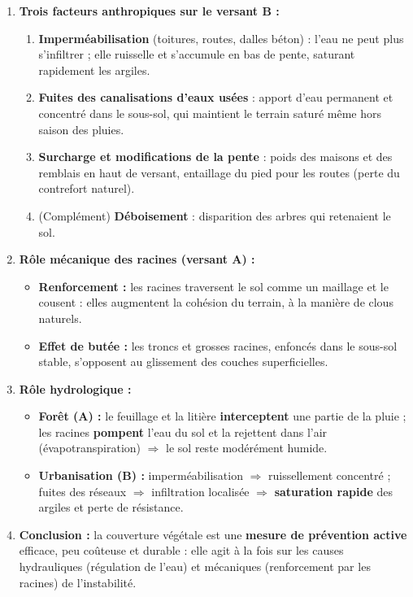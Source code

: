 \documentclass[11pt]{article}
\begin{document}
\begin{corrige}
\tcblower
\begin{enumerate}
\item \textbf{Trois facteurs anthropiques sur le versant B :}
      \begin{enumerate}
      \item \textbf{Imperméabilisation} (toitures, routes, dalles béton) : l'eau ne peut plus s'infiltrer ; elle ruisselle et s'accumule en bas de pente, saturant rapidement les argiles.
      \item \textbf{Fuites des canalisations d'eaux usées} : apport d'eau permanent et concentré dans le sous-sol, qui maintient le terrain saturé même hors saison des pluies.
      \item \textbf{Surcharge et modifications de la pente} : poids des maisons et des remblais en haut de versant, entaillage du pied pour les routes (perte du contrefort naturel).
      \item (Complément) \textbf{Déboisement} : disparition des arbres qui retenaient le sol.
      \end{enumerate}
\item \textbf{Rôle mécanique des racines (versant A) :}
      \begin{itemize}
      \item \textbf{Renforcement :} les racines traversent le sol comme un maillage et le \og cousent \fg{} : elles augmentent la cohésion du terrain, à la manière de clous naturels.
      \item \textbf{Effet de butée :} les troncs et grosses racines, enfoncés dans le sous-sol stable, s'opposent au glissement des couches superficielles.
      \end{itemize}
\item \textbf{Rôle hydrologique :}
      \begin{itemize}
      \item \textbf{Forêt (A) :} le feuillage et la litière \textbf{interceptent} une partie de la pluie ; les racines \textbf{pompent} l'eau du sol et la rejettent dans l'air (évapotranspiration) $\Rightarrow$ le sol reste modérément humide.
      \item \textbf{Urbanisation (B) :} imperméabilisation $\Rightarrow$ ruissellement concentré ; fuites des réseaux $\Rightarrow$ infiltration localisée $\Rightarrow$ \textbf{saturation rapide} des argiles et perte de résistance.
      \end{itemize}
\item \textbf{Conclusion :} la couverture végétale est une \textbf{mesure de prévention active} efficace, peu coûteuse et durable : elle agit à la fois sur les causes hydrauliques (régulation de l'eau) et mécaniques (renforcement par les racines) de l'instabilité.
\end{enumerate}
\end{corrige}
\end{document}
